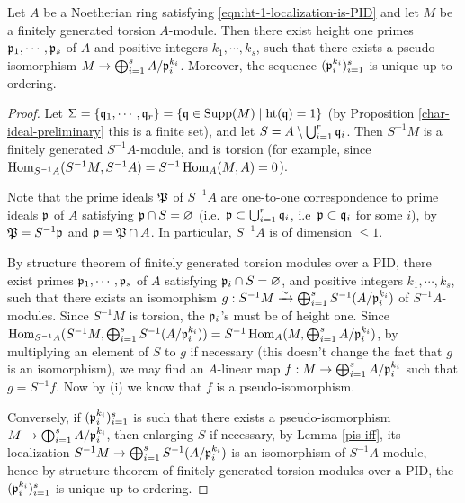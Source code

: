 \begin{prop}
\label{structure-thm}
Let $A$ be a Noetherian ring satisfying \eqref{eqn:ht-1-localization-is-PID}
and let $M$ be a finitely generated torsion $A$-module.
Then there exist height one primes ${\mathfrak{p}}_1,\cdots,{\mathfrak{p}}_s$ of $A$
and positive integers $k_1,\cdots,k_s$, such that there exists a pseudo-isomorphism
$M\to\bigoplus_{i=1}^s A/{\mathfrak{p}}_i^{k_i}$.
Moreover, the sequence $({\mathfrak{p}}_i^{k_i})_{i=1}^s$ is unique up to ordering.
\end{prop}

\begin{proof}
Let
$\Sigma=\{{\mathfrak{q}}_1,\cdots,{\mathfrak{q}}_r\}=\{{\mathfrak{q}}\in{\mathrm{Supp}}(M)\mid{\mathrm{ht}}({\mathfrak{q}})=1\}$
(by Proposition \ref{char-ideal-preliminary} this is a finite set),
and let $S=A\setminus\bigcup_{i=1}^r{\mathfrak{q}}_i$.
Then $S^{-1}M$ is a finitely generated $S^{-1}A$-module,
and is torsion (for example, since $\operatorname{Hom}_{S^{-1}A}(S^{-1}M,S^{-1}A)
=S^{-1}\operatorname{Hom}_A(M,A)=0$).

Note that the prime ideals ${\mathfrak{P}}$ of $S^{-1}A$ are one-to-one correspondence
to prime ideals ${\mathfrak{p}}$ of $A$ satisfying ${\mathfrak{p}}\cap S=\varnothing$
(i.e.~${\mathfrak{p}}\subset\bigcup_{i=1}^r{\mathfrak{q}}_i$, i.e~${\mathfrak{p}}\subset{\mathfrak{q}}_i$ for some $i$),
by ${\mathfrak{P}}=S^{-1}{\mathfrak{p}}$ and ${\mathfrak{p}}={\mathfrak{P}}\cap A$.
In particular, $S^{-1}A$ is of dimension $\leq 1$.

By structure theorem of finitely generated torsion modules over a PID,
there exist primes ${\mathfrak{p}}_1,\cdots,{\mathfrak{p}}_s$ of $A$
satisfying ${\mathfrak{p}}_i\cap S=\varnothing$,
and positive integers $k_1,\cdots,k_s$, such that
there exists an isomorphism
$g:S^{-1}M\xrightarrow\sim\bigoplus_{i=1}^sS^{-1}(A/{\mathfrak{p}}_i^{k_i})$
of $S^{-1}A$-modules.
Since $S^{-1}M$ is torsion, the ${\mathfrak{p}}_i$'s must be of height one.
Since $\operatorname{Hom}_{S^{-1}A}(S^{-1}M,\bigoplus_{i=1}^sS^{-1}(A/{\mathfrak{p}}_i^{k_i}))
=S^{-1}\operatorname{Hom}_A(M,\bigoplus_{i=1}^sA/{\mathfrak{p}}_i^{k_i})$,
by multiplying an element of $S$ to $g$ if necessary
(this doesn't change the fact that $g$ is an isomorphism), we may find
an $A$-linear map $f:M\to\bigoplus_{i=1}^sA/{\mathfrak{p}}_i^{k_i}$
such that $g=S^{-1}f$.
Now by (i) we know that $f$ is a pseudo-isomorphism.

Conversely, if $({\mathfrak{p}}_i^{k_i})_{i=1}^s$ is such that there exists a
pseudo-isomorphism
$M\to\bigoplus_{i=1}^s A/{\mathfrak{p}}_i^{k_i}$,
then enlarging $S$ if necessary, by Lemma \ref{pis-iff},
its localization
$S^{-1}M\to\bigoplus_{i=1}^sS^{-1}(A/{\mathfrak{p}}_i^{k_i})$
is an isomorphism of $S^{-1}A$-module, hence by
structure theorem of finitely generated torsion modules over a PID,
the $({\mathfrak{p}}_i^{k_i})_{i=1}^s$ is unique up to ordering.
\end{proof}

